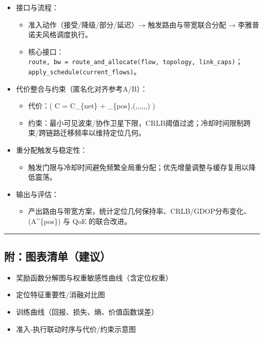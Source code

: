 \begin{itemize}
\tightlist
\item
  接口与流程：

  \begin{itemize}
  \tightlist
  \item
    准入动作（接受/降级/部分/延迟）→ 触发路由与带宽联合分配 →
    李雅普诺夫风格调度执行。
  \item
    核心接口：\texttt{route,\ bw\ =\ route\_and\_allocate(flow,\ topology,\ link\_caps)}；\texttt{apply\_schedule(current\_flows)}。
  \end{itemize}
\item
  代价整合与约束（匿名化对齐参考A/B）：

  \begin{itemize}
  \tightlist
  \item
    代价：( C = C\_\{net\} +
    \lambda\_\{pos\},\Phi(,,,,,,)
    )
  \item
    约束：最小可见波束/协作卫星下限，CRLB阈值过滤；冷却时间限制跨束/跨链路迁移频率以维持定位几何。
  \end{itemize}
\item
  重分配触发与稳定性：

  \begin{itemize}
  \tightlist
  \item
    触发门限与冷却时间避免频繁全局重分配；优先增量调整与缓存复用以降低震荡。
  \end{itemize}
\item
  输出与评估：

  \begin{itemize}
  \tightlist
  \item
    产出路由与带宽方案，统计定位几何保持率、CRLB/GDOP分布变化、(A\^{}\{pos\})
    与 QoE 的联合改进。
  \end{itemize}
\end{itemize}

\begin{center}\rule{0.5\linewidth}{0.5pt}\end{center}

\subsection{附：图表清单（建议）}\label{ux9644ux56feux8868ux6e05ux5355ux5efaux8bae-2}

\begin{itemize}
\tightlist
\item
  奖励函数分解图与权重敏感性曲线（含定位权重）
\item
  定位特征重要性/消融对比图
\item
  训练曲线（回报、损失、熵、价值函数误差）
\item
  准入-执行联动时序与代价/约束示意图
\end{itemize}

